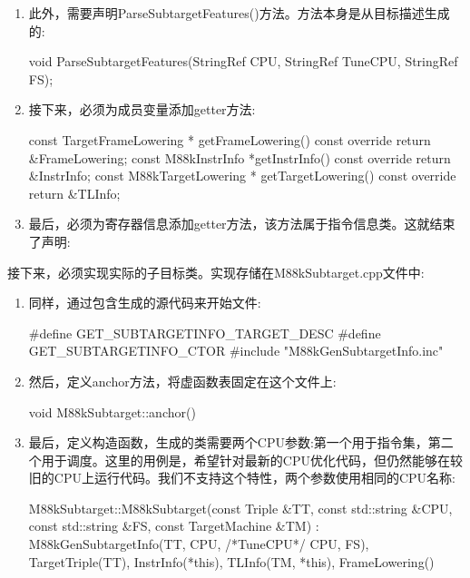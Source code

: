 \begin{enumerate}
\item
此外，需要声明ParseSubtargetFeatures()方法。方法本身是从目标描述生成的:

\begin{cpp}
    void ParseSubtargetFeatures(StringRef CPU,
                                StringRef TuneCPU,
                                StringRef FS);
\end{cpp}

\item
接下来，必须为成员变量添加getter方法:

\begin{cpp}
    const TargetFrameLowering *
    getFrameLowering() const override {
        return &FrameLowering;
    }
    const M88kInstrInfo *getInstrInfo() const override {
        return &InstrInfo;
    }
    const M88kTargetLowering *
    getTargetLowering() const override {
        return &TLInfo;
    }
\end{cpp}

\item
最后，必须为寄存器信息添加getter方法，该方法属于指令信息类。这就结束了声明:

\begin{cpp}
    const M88kRegisterInfo *
    getRegisterInfo() const override {
        return &InstrInfo.getRegisterInfo();
    }
};
} // end namespace llvm
\end{cpp}

\end{enumerate}

接下来，必须实现实际的子目标类。实现存储在M88kSubtarget.cpp文件中:

\begin{enumerate}
\item
同样，通过包含生成的源代码来开始文件:

\begin{cpp}
#define GET_SUBTARGETINFO_TARGET_DESC
#define GET_SUBTARGETINFO_CTOR
#include "M88kGenSubtargetInfo.inc"
\end{cpp}

\item
然后，定义anchor方法，将虚函数表固定在这个文件上:

\begin{cpp}
void M88kSubtarget::anchor() {}
\end{cpp}

\item
最后，定义构造函数，生成的类需要两个CPU参数:第一个用于指令集，第二个用于调度。这里的用例是，希望针对最新的CPU优化代码，但仍然能够在较旧的CPU上运行代码。我们不支持这个特性，两个参数使用相同的CPU名称:

\begin{cpp}
M88kSubtarget::M88kSubtarget(const Triple &TT,
                             const std::string &CPU,
                             const std::string &FS,
                             const TargetMachine &TM)
    : M88kGenSubtargetInfo(TT, CPU, /*TuneCPU*/ CPU, FS),
      TargetTriple(TT), InstrInfo(*this),
      TLInfo(TM, *this), FrameLowering() {}
\end{cpp}
\end{enumerate}

